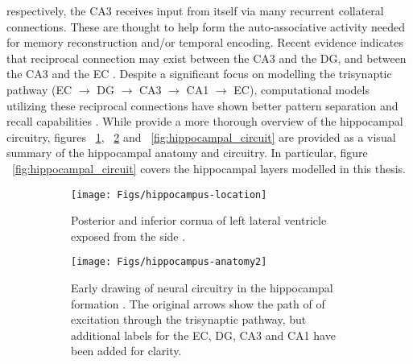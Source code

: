 respectively, the CA3 receives input from itself via many recurrent collateral connections. 
These are thought to help form the auto-associative activity needed for memory reconstruction 
and/or temporal encoding. 
Recent evidence indicates that reciprocal connection may exist between the CA3 
and the \ac{DG}, and between the CA3 and the \ac{EC} \citep{CA3_DG_backprojections_bio}. 
Despite a significant focus on modelling the trisynaptic pathway 
(\ac{EC} $\rightarrow$ \ac{DG} $\rightarrow$ CA3 $\rightarrow$ CA1 $\rightarrow$ \ac{EC}), 
computational models utilizing these reciprocal connections have shown better pattern separation and recall 
capabilities \citep{CA3_DG_backprojections}. 
While \citet{hippocampal-circuit} provide a more thorough overview of the hippocampal circuitry,
figures ~\ref{fig:hippocampus-loc}, ~\ref{fig:hippocampus-ana} and ~\ref{fig:hippocampal_circuit} 
are provided as a visual summary of the hippocampal anatomy and circuitry. 
In particular, figure ~\ref{fig:hippocampal_circuit} covers the hippocampal 
layers modelled in this thesis.

\begin{figure}[!ht]
\centering
\begin{subfigure}[b]{.45\textwidth}
	\texttt{[image: Figs/hippocampus-location]}
	\caption{Posterior and inferior cornua of left lateral ventricle exposed from the side \citep{gray-1918}.}
	\label{fig:hippocampus-loc}
\end{subfigure}
\qquad
\begin{subfigure}[b]{.45\textwidth}
	\centering
	\texttt{[image: Figs/hippocampus-anatomy2]}
	\caption{
	Early drawing of neural circuitry in the hippocampal formation \citep{cajal-1909}. 
	The original arrows show the path of of excitation through the trisynaptic pathway, 
	but additional labels for the \ac{EC}, 
	\ac{DG}, CA3 and CA1 have been added for clarity.
	}
	\label{fig:hippocampus-ana}
\end{subfigure}
\caption{}
\label{fig:hippocampal-anatomy}
\end{figure}

